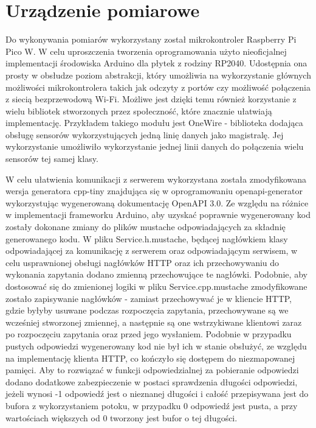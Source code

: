 \section{Urządzenie pomiarowe}
Do wykonywania pomiarów wykorzystany został mikrokontroler Raspberry Pi Pico W.
W celu uproszczenia tworzenia oprogramowania użyto nieoficjalnej implementacji
środowiska Arduino dla płytek z rodziny RP2040. Udostępnia ona prosty
w obsłudze poziom abstrakcji, który umożliwia na wykorzystanie głównych
możliwości mikrokontrolera takich jak odczyty z portów czy możliwość połączenia
z siecią bezprzewodową Wi-Fi. Możliwe jest dzięki temu również korzystanie z
wielu bibliotek stworzonych przez społeczność, które znacznie ułatwiają implementację.
Przykładem takiego modułu jest OneWire - biblioteka dodająca obsługę sensorów 
wykorzystujących jedną linię danych jako magistralę.
Jej wykorzystanie umożliwiło wykorzystanie jednej linii danych do połączenia wielu 
sensorów tej samej klasy.

W celu ułatwienia komunikacji z serwerem wykorzystana została zmodyfikowana wersja
generatora cpp-tiny znajdująca się w oprogramowaniu openapi-generator wykorzystując
wygenerowaną dokumentację OpenAPI 3.0. 
Ze względu na różnice w implementacji frameworku Arduino, aby uzyskać poprawnie 
wygenerowany kod zostały dokonane zmiany do plików mustache odpowiadających za składnię
generowanego kodu. W pliku Service.h.mustache, będącej nagłówkiem klasy odpowiadającej za komunikację z serwerem
oraz odpowiadającym serwisem, w celu usprawnionej obsługi nagłówków
HTTP oraz ich przechowywaniu do wykonania zapytania dodano zmienną przechowujące te nagłówki.
Podobnie, aby dostosować się do zmienionej logiki w pliku Service.cpp.mustache zmodyfikowane
zostało zapisywanie nagłówków - zamiast przechowywać je w kliencie HTTP, gdzie byłyby usuwane podczas
rozpoczęcia zapytania, przechowywane są we wcześniej stworzonej zmiennej, a następnie są one
wstrzykiwane klientowi zaraz po rozpoczęciu zapytania oraz przed jego wysłaniem.
Podobnie w przypadku pustych odpowiedzi wygenerowany kod nie był ich w stanie obsłużyć,
ze względu na implementację klienta HTTP, co kończyło się dostępem do niezmapowanej pamięci. 
Aby to rozwiązać w funkcji odpowiedzialnej 
za pobieranie odpowiedzi dodano dodatkowe zabezpieczenie w postaci sprawdzenia
długości odpowiedzi, jeżeli wynosi -1 odpowiedź jest o nieznanej długości i całość przepisywana jest
do bufora z wykorzystaniem potoku, w przypadku 0 odpowiedź jest pusta, a przy wartościach większych od
0 tworzony jest bufor o tej długości.

